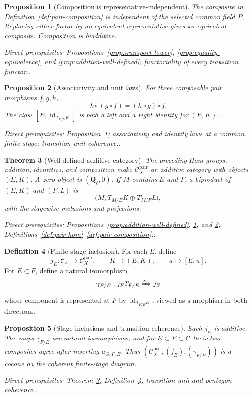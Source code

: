 \documentclass[10pt]{article}
\newtheorem{theorem}{Theorem}[section]
\newtheorem{proposition}[theorem]{Proposition}
\theoremstyle{definition}
\newtheorem{definition}[theorem]{Definition}
\newcommand{\Ql}{\mathbf Q_\ell}
\newcommand{\Pair}{\mathcal C_X^{\mathrm{pair}}}
\newcommand{\depends}[1]{\par\smallskip\noindent\textit{Direct prerequisites:} #1.}
\begin{document}
\begin{proposition}[Composition is representative-independent]
\label{prop:composition-well-defined}
The composite in Definition~\ref{def:pair-composition} is independent of
the selected common field $P$.  Replacing either factor by an equivalent
representative gives an equivalent composite.  Composition is biadditive.
\depends{Propositions~\ref{prop:transport-tower},
\ref{prop:equality-equivalence}, and
\ref{prop:addition-well-defined}; functoriality of every transition functor.}
\end{proposition}

\begin{proposition}[Associativity and unit laws]
\label{prop:composition-laws}
For three composable pair morphisms $f,g,h$,
\[
 h\circ(g\circ f)=(h\circ g)\circ f.
\]
The class $[E,\operatorname{id}_{T_{E/E}K}]$ is both a left and a right
identity for $(E,K)$.
\depends{Proposition~\ref{prop:composition-well-defined}; associativity and
identity laws at a common finite stage; transition unit coherence.}
\end{proposition}

\begin{theorem}[Well-defined additive category]\label{thm:pair-category}
The preceding Hom groups, addition, identities, and composition make
$\Pair$ an additive category with objects $(E,K)$.  A zero object is
$(\Ql,0)$.  If $M$ contains $E$ and $F$, a biproduct of $(E,K)$ and $(F,L)$
is
\[
 \bigl(M,T_{M/E}K\oplus T_{M/F}L\bigr),
\]
with the stagewise inclusions and projections.
\depends{Propositions~\ref{prop:addition-well-defined},
\ref{prop:composition-well-defined}, and \ref{prop:composition-laws};
Definitions~\ref{def:pair-hom}--\ref{def:pair-composition}.}
\end{theorem}

\begin{definition}[Finite-stage inclusion]\label{def:stage-inclusion}
For each $E$, define
\[
 j_E:\mathcal C_E\longrightarrow\Pair,
 \qquad K\longmapsto(E,K),\qquad
 u\longmapsto[E,u].
\]
For $E\subset F$, define a natural isomorphism
\[
 \gamma_{F/E}:j_FT_{F/E}\xRightarrow{\sim}j_E
\]
whose component is represented at $F$ by
$\operatorname{id}_{T_{F/E}K}$, viewed as a morphism in both directions.
\end{definition}

\begin{proposition}[Stage inclusions and transition coherence]
\label{prop:stage-inclusions}
Each $j_E$ is additive.  The maps $\gamma_{F/E}$ are natural isomorphisms,
and for $E\subset F\subset G$ their two composites agree after inserting
$a_{G,F,E}$.  Thus $(\Pair,(j_E),(\gamma_{F/E}))$ is a cocone on the
coherent finite-stage diagram.
\depends{Theorem~\ref{thm:pair-category};
Definition~\ref{def:stage-inclusion}; transition unit and pentagon
coherence.}
\end{proposition}
\end{document}
